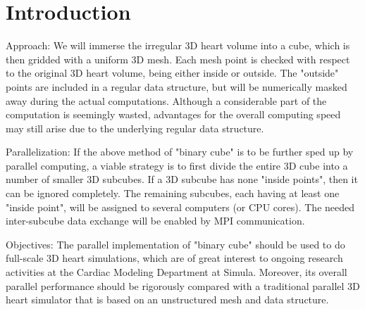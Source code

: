 \chapter{Introduction} 

Approach: We will immerse the irregular 3D heart volume into a cube, which is then gridded with a uniform 3D mesh. Each mesh point is checked with respect to the original 3D heart volume, being either inside or outside. The "outside" points are included in a regular data structure, but will be numerically masked away during the actual computations. Although a considerable part of the computation is seemingly wasted, advantages for the overall computing speed may still arise due to the underlying regular data structure.

Parallelization: If the above method of "binary cube" is to be further sped up by parallel computing, a viable strategy is to first divide the entire 3D cube into a number of smaller 3D subcubes. If a 3D subcube has none "inside points", then it can be ignored completely. The remaining subcubes, each having at least one "inside point", will be assigned to several computers (or CPU cores). The needed inter-subcube data exchange will be enabled by MPI communication.

Objectives: The parallel implementation of "binary cube" should be used to do full-scale 3D heart simulations, which are of great interest to ongoing research activities at the Cardiac Modeling Department at Simula. Moreover, its overall parallel performance should be rigorously compared with a traditional parallel 3D heart simulator that is based on an unstructured mesh and data structure.






